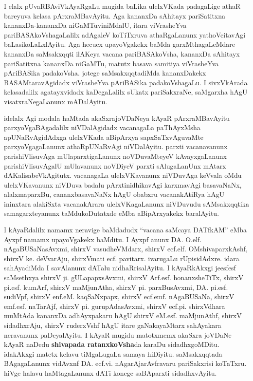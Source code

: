 \medskip

I elalx pUvaRBAviVkAyaRgaLu mugida baLika ulelxVKada padagaLige athaR bareyuva kelasa pArxraMBavAyitu. Aga kananxDa sAhitayx pariSatitxna kananxDa-kananxDa niGaMTuviniMdalU, itara viVrasheYva pariBASAkoVshagaLalilx adAgaleV koTiTxruva athaRgaLanunx yathoVcitavAgi baLasikoLaLxlAyitu. Aga hecucx upayoVgakekx baMda garxMthagaLeMdare kananxDa saMsakxqqti ilAKeya vacana pariBASAkoVsha, kananxDa sAhitayx pariSatitxna kananxDa niGaMTu, matutx basava samitiya viVrasheYva pAri\-BASika padakoVsha. jotege saMsakxqqtadiMda kananxDakekx BASAMtaravAgidadx viVrasheYva pAriBASika padakoVshagaLu. I sivxVkArada kelasadalilx agatayxvidadx kaDegaLalilx sUkatx pariSakxraNe, saMgarxha hAgU visatxraNegaLanunx mADalAyitu.

\medskip

idelalx Agi modala haMtada akaSxrajoVDaNeya kAyaR pArxraMBavAyitu parxyoVgaBAgadalilx niVDalAgidadx vacanagaLa paThAyxMsha apUNaRvAgidAdxga ulelxVKada aBipArxya sapxSaTxvAguvaMte parxyoVgagaLanunx athaRpUNaRvAgi niVDalAyitu. parxti vacanavanunx parishiVlisuvAga mUlaparxtigaLanunx noVDuvaMteyeV kAvayxgaLanunx parishiVlisuvAgalU mUlavanunx noVDiyeV parxti sAlugaLanUnx mAtarx dAKalisabeVkAgitutx. vacanagaLa ulelxVKavanunx niVDuvAga keVvala oMdu ulelxVKavanunx niVDuva badalu  pArxtinidhikavAgi karxmavAgi basavaNaNx, alalxmaparxBu, cananxbasavaNaNx hAgU obabxru vacanakAtiRya hAgU ininxtara alakiSxta vacanakArara ulelxVKagaLanunx niVDuvudu sAMsakxqqtika samagarxteyanunx taMdukoDutatxde eMba aBipArxyakekx baralAyitu.

\medskip

I kAyaRdalilx namamx neravige baMdadudx ``vacana saMcaya DATfkAM'' eMba  Ayxpf namamx upayoVgakekx baMditu. I Ayxpf anunx DA. O.elf. nAgaBUSaNa\-sAvxmi, shirxV vasudheVMdarx, shirxV ecf.elf. OMshivaparxkAshf, shirxV ke. deVvarAju, shirxVmati ecf. pavitarx.  ivaru\-gaLu rUpisidAdxre.  idara sahAyadiMda I savAlanunx dATalu nidhaRrisalAyitu. I kAyaRkAkxgi jeesfesf saMsethxya shirxV ji. gULapapxsAvxmi, shirxV Arf.esf. honanxsheTiTx, shirxV pi.esf. kumArf,  shirxV maMjunAtha, shirxV pi. parxBusAvxmi, DA. pi.esf. sudiVpf, shirxV enf.eM. kaqSaNxpapx, shirxV ecf.emf. nAgaBUSaNa, shirxV emf.esf. naTarAjf, shirxV pi. gurupAdasAvxmi, shirxV ecf.pi. shirxVdhara muMtAda kananxDa adhAyxpakaru hAgU shirxV eM.esf. maMjunAthf, shirxV sidadhxrAju, shirxV ruderxVshf hAgU itare gaNakayaMtarx sahAyakara neravanunx paDeyalAyitu. I kAyaR mugidu matotxmemx akaSxra joVDaNe kAyaR naDedu \textbf{shivapada ratanxkoVsha}da karaDu sidadhxgoMDitu. idakAkxgi matetx kelavu tiMgaLugaLa samaya hiDiyitu. saMsakxqqtada BAgagaLanunx vidAvxnf DA. ecf.vi. nAgarAjarAvfravaru pariSakxrisi koTaTxru. hiVge halavu haMtagaLanunx dATi konege saBAparxti sidadhxvAyitu.

